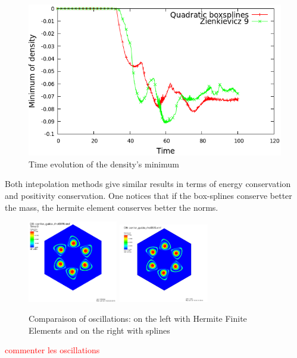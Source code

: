 \documentclass[proc]{edpsmath}
\begin{document}
\begin{figure}[h!]
	\includegraphics[scale=0.4]{figures/min_density_160.png}
	\caption{Time evolution of the density's minimum}
\end{figure}




Both intepolation methods give similar results in terms of energy conservation and positivity conservation. One notices that if the box-splines conserve better the mass, the hermite element conserves better the norms.  



\begin{figure}[h!]
	\includegraphics[width=0.35\textwidth]{figures/oscillations_hermite.png}
	\includegraphics[width=0.35\textwidth]{figures/oscillations_splines.png}
	\caption{Comparaison of oscillations: on the left with Hermite Finite Elements and on the right with splines}
\end{figure}
\textcolor{red}{commenter les oscillations}
\end{document}
